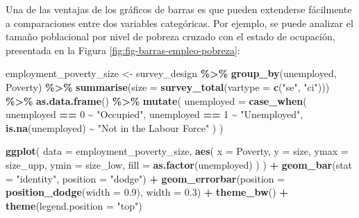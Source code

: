 \documentclass[
  spanish,
  12pt,
]{book}
\newenvironment{Shaded}{\begin{snugshade}}{\end{snugshade}}
\newcommand{\AttributeTok}[1]{\textcolor[rgb]{0.13,0.29,0.53}{#1}}
\newcommand{\DecValTok}[1]{\textcolor[rgb]{0.00,0.00,0.81}{#1}}
\newcommand{\FloatTok}[1]{\textcolor[rgb]{0.00,0.00,0.81}{#1}}
\newcommand{\FunctionTok}[1]{\textcolor[rgb]{0.13,0.29,0.53}{\textbf{#1}}}
\newcommand{\NormalTok}[1]{#1}
\newcommand{\OtherTok}[1]{\textcolor[rgb]{0.56,0.35,0.01}{#1}}
\newcommand{\SpecialCharTok}[1]{\textcolor[rgb]{0.81,0.36,0.00}{\textbf{#1}}}
\newcommand{\StringTok}[1]{\textcolor[rgb]{0.31,0.60,0.02}{#1}}
\begin{document}
Una de las ventajas de los gráficos de barras es que pueden extenderse fácilmente a comparaciones entre dos variables categóricas. Por ejemplo, se puede analizar el tamaño poblacional por nivel de pobreza cruzado con el estado de ocupación, presentada en la Figura \ref{fig:fig-barras-empleo-pobreza}:

\begin{Shaded}
\begin{Highlighting}[]
\NormalTok{employment\_poverty\_size }\OtherTok{\textless{}{-}}\NormalTok{ survey\_design }\SpecialCharTok{\%\textgreater{}\%}
  \FunctionTok{group\_by}\NormalTok{(unemployed, Poverty) }\SpecialCharTok{\%\textgreater{}\%}
  \FunctionTok{summarise}\NormalTok{(}\AttributeTok{size =} \FunctionTok{survey\_total}\NormalTok{(}\AttributeTok{vartype =} \FunctionTok{c}\NormalTok{(}\StringTok{"se"}\NormalTok{, }\StringTok{"ci"}\NormalTok{))) }\SpecialCharTok{\%\textgreater{}\%}
  \FunctionTok{as.data.frame}\NormalTok{() }\SpecialCharTok{\%\textgreater{}\%}
  \FunctionTok{mutate}\NormalTok{(}
    \AttributeTok{unemployed =} \FunctionTok{case\_when}\NormalTok{(}
\NormalTok{      unemployed }\SpecialCharTok{==} \DecValTok{0} \SpecialCharTok{\textasciitilde{}} \StringTok{"Occupied"}\NormalTok{,}
\NormalTok{      unemployed }\SpecialCharTok{==} \DecValTok{1} \SpecialCharTok{\textasciitilde{}} \StringTok{"Unemployed"}\NormalTok{,}
      \FunctionTok{is.na}\NormalTok{(unemployed) }\SpecialCharTok{\textasciitilde{}} \StringTok{"Not in the Labour Force"}
\NormalTok{    )}
\NormalTok{  )}

\FunctionTok{ggplot}\NormalTok{(}
  \AttributeTok{data =}\NormalTok{ employment\_poverty\_size,}
  \FunctionTok{aes}\NormalTok{(}
    \AttributeTok{x =}\NormalTok{ Poverty, }\AttributeTok{y =}\NormalTok{ size,}
    \AttributeTok{ymax =}\NormalTok{ size\_upp, }\AttributeTok{ymin =}\NormalTok{ size\_low,}
    \AttributeTok{fill =} \FunctionTok{as.factor}\NormalTok{(unemployed)}
\NormalTok{  )}
\NormalTok{) }\SpecialCharTok{+}
  \FunctionTok{geom\_bar}\NormalTok{(}\AttributeTok{stat =} \StringTok{"identity"}\NormalTok{, }\AttributeTok{position =} \StringTok{"dodge"}\NormalTok{) }\SpecialCharTok{+}
  \FunctionTok{geom\_errorbar}\NormalTok{(}\AttributeTok{position =} \FunctionTok{position\_dodge}\NormalTok{(}\AttributeTok{width =} \FloatTok{0.9}\NormalTok{), }\AttributeTok{width =} \FloatTok{0.3}\NormalTok{) }\SpecialCharTok{+}
  \FunctionTok{theme\_bw}\NormalTok{() }\SpecialCharTok{+}
  \FunctionTok{theme}\NormalTok{(}\AttributeTok{legend.position =} \StringTok{"top"}\NormalTok{)}
\end{Highlighting}
\end{Shaded}
\end{document}
